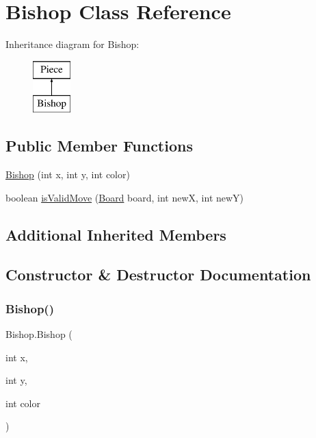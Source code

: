 \hypertarget{class_bishop}{}\section{Bishop Class Reference}
\label{class_bishop}
Inheritance diagram for Bishop\+:\begin{figure}[H]
\begin{center}
\leavevmode
\includegraphics[height=2.000000cm]{class_bishop}
\end{center}
\end{figure}
\subsection*{Public Member Functions}
\begin{DoxyCompactItemize}
\item 
\mbox{\hyperlink{class_bishop_a869363dffdba230891b9fc6a9609c86b}{Bishop}} (int x, int y, int color)
\item 
boolean \mbox{\hyperlink{class_bishop_a73bbe709fbe0a52ddb75b7b40965d50b}{is\+Valid\+Move}} (\mbox{\hyperlink{class_board}{Board}} board, int newX, int newY)
\end{DoxyCompactItemize}
\subsection*{Additional Inherited Members}


\subsection{Constructor \& Destructor Documentation}
\mbox{\label{class_bishop_a869363dffdba230891b9fc6a9609c86b}} 
\subsubsection{\texorpdfstring{Bishop()}{Bishop()}}
{\footnotesize\ttfamily Bishop.\+Bishop (\begin{DoxyParamCaption}\item[{int}]{x,  }\item[{int}]{y,  }\item[{int}]{color }\end{DoxyParamCaption})\hspace{0.3cm}{\ttfamily [inline]}}

